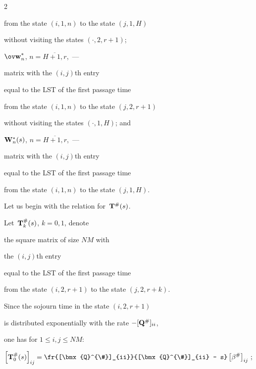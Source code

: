 \begin{multicols}{2}
\begin{description}
from the state $(i,1,n)$ to the state $(j,1,H)$


without visiting the states $(\cdot,2,r+1)$;





\item[\,] 


$\bmx{\ov w}^*_n$, $n=\overline{H+1,r}$,~---


matrix with the $(i,j)${th} entry 


equal to the LST of the first passage time 


from the state $(i,1,n)$ to the state $(j,2,r+1)$


without visiting the states $(\cdot,1,H)$; and


\item[\,] 


$\mathbf{W}^*_n(s)$, $n=\overline{H+1,r}$,~---


matrix with the $(i,j)${th} entry 


equal to the LST of the first passage time 


from the state $(i,1,n)$ to the state $(j,1,H)$.


\end{description}





Let us begin with the relation for~$\mathbf{T}^{\#}(s)$. 


Let~$\mathbf{T}^{\#}_k(s)$, $k=0,1$, denote 


the square matrix of size $NM$ with 


the $(i,j)${th} entry 


equal to the LST of the first passage time 


from the state $(i,2,r+1)$ to the state $(j,2,r+k)$.


Since the sojourn time in the state $(i,2,r+1)$


is distributed exponentially with the rate $-[\mathbf{Q}^{\#}]_{ii}$, 


one has for $1 \le i,j \le NM$:


\begin{gather*}


\left[ \bmx{T}^{\#}_0(s) \right]_{ij}


=


\fr{[\bmx{Q}^{\#}]_{ii}}{[\bmx{Q}^{\#}]_{ii} - s}


\left[\beta^{\#}\right]_{ij}  \,;


\\



\end{gather*}
\end{multicols}
